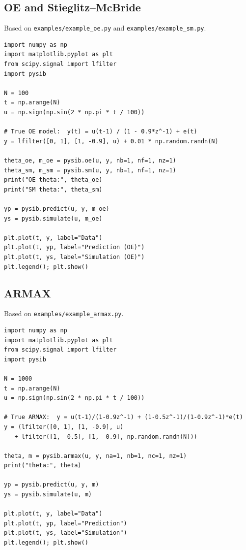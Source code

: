 \documentclass[11pt,a4paper]{article}
\begin{document}
\subsection{OE and Stieglitz--McBride}

Based on \texttt{examples/example\_oe.py} and \texttt{examples/example\_sm.py}.

\begin{lstlisting}
import numpy as np
import matplotlib.pyplot as plt
from scipy.signal import lfilter
import pysib

N = 100
t = np.arange(N)
u = np.sign(np.sin(2 * np.pi * t / 100))

# True OE model:  y(t) = u(t-1) / (1 - 0.9*z^-1) + e(t)
y = lfilter([0, 1], [1, -0.9], u) + 0.01 * np.random.randn(N)

theta_oe, m_oe = pysib.oe(u, y, nb=1, nf=1, nz=1)
theta_sm, m_sm = pysib.sm(u, y, nb=1, nf=1, nz=1)
print("OE theta:", theta_oe)
print("SM theta:", theta_sm)

yp = pysib.predict(u, y, m_oe)
ys = pysib.simulate(u, m_oe)

plt.plot(t, y, label="Data")
plt.plot(t, yp, label="Prediction (OE)")
plt.plot(t, ys, label="Simulation (OE)")
plt.legend(); plt.show()
\end{lstlisting}

\subsection{ARMAX}

Based on \texttt{examples/example\_armax.py}.

\begin{lstlisting}
import numpy as np
import matplotlib.pyplot as plt
from scipy.signal import lfilter
import pysib

N = 1000
t = np.arange(N)
u = np.sign(np.sin(2 * np.pi * t / 100))

# True ARMAX:  y = u(t-1)/(1-0.9z^-1) + (1-0.5z^-1)/(1-0.9z^-1)*e(t)
y = (lfilter([0, 1], [1, -0.9], u)
   + lfilter([1, -0.5], [1, -0.9], np.random.randn(N)))

theta, m = pysib.armax(u, y, na=1, nb=1, nc=1, nz=1)
print("theta:", theta)

yp = pysib.predict(u, y, m)
ys = pysib.simulate(u, m)

plt.plot(t, y, label="Data")
plt.plot(t, yp, label="Prediction")
plt.plot(t, ys, label="Simulation")
plt.legend(); plt.show()
\end{lstlisting}
\end{document}
